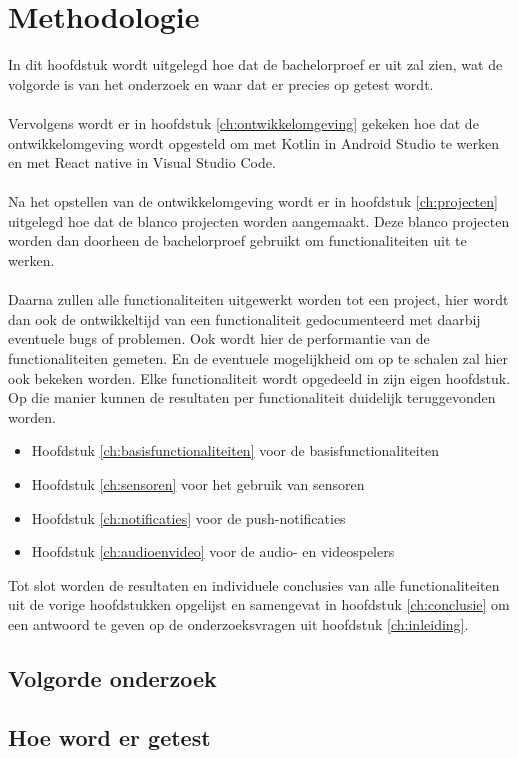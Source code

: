 
\chapter{Methodologie}
\label{ch:methodologie}

In dit hoofdstuk wordt uitgelegd hoe dat de bachelorproef er uit zal zien, wat 
de volgorde is van het onderzoek en waar dat er precies op getest wordt.
\\\\
Vervolgens wordt er in hoofdstuk \ref{ch:ontwikkelomgeving} gekeken hoe 
dat de ontwikkelomgeving wordt opgesteld om met Kotlin in Android Studio 
te werken en met React native in Visual Studio Code.
\\\\
Na het opstellen van de ontwikkelomgeving wordt er in hoofdstuk 
\ref{ch:projecten} uitgelegd hoe dat de blanco projecten worden aangemaakt. 
Deze blanco projecten worden dan doorheen de bachelorproef gebruikt om 
functionaliteiten uit te werken.
\\\\
Daarna zullen alle functionaliteiten uitgewerkt worden tot een project, 
hier wordt dan ook de ontwikkeltijd van een functionaliteit gedocumenteerd 
met daarbij eventuele bugs of problemen. Ook wordt hier de performantie van 
de functionaliteiten gemeten. En de eventuele mogelijkheid om op te 
schalen zal hier ook bekeken worden. Elke functionaliteit wordt opgedeeld 
in zijn eigen hoofdstuk. Op die manier kunnen de resultaten per 
functionaliteit duidelijk teruggevonden worden.
\begin{itemize}
    \item Hoofdstuk \ref{ch:basisfunctionaliteiten} voor de basisfunctionaliteiten
    \item Hoofdstuk \ref{ch:sensoren} voor het gebruik van sensoren
    \item Hoofdstuk \ref{ch:notificaties} voor de push-notificaties
    \item Hoofdstuk \ref{ch:audioenvideo} voor de audio- en videospelers
\end{itemize}
Tot slot worden de resultaten en individuele conclusies van alle 
functionaliteiten uit de vorige hoofdstukken opgelijst en samengevat in hoofdstuk 
\ref{ch:conclusie} om een antwoord te geven op de onderzoeksvragen uit 
hoofdstuk \ref{ch:inleiding}.

\section{Volgorde onderzoek}



\section{Hoe word er getest}




